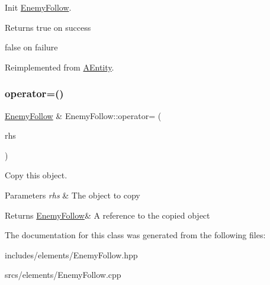 Init \hyperlink{class_enemy_follow}{Enemy\+Follow}. 

\begin{DoxyReturn}{Returns}
true on success 

false on failure 
\end{DoxyReturn}


Reimplemented from \hyperlink{class_a_entity_a450361b684fa02e4ffe0ba406b8e3b30}{A\+Entity}.

\mbox{\label{class_enemy_follow_a3cc6083a7064b33fabe7e0b7a4a69910}} 
\subsubsection{\texorpdfstring{operator=()}{operator=()}}
{\footnotesize\ttfamily \hyperlink{class_enemy_follow}{Enemy\+Follow} \& Enemy\+Follow\+::operator= (\begin{DoxyParamCaption}\item[{\hyperlink{class_enemy_follow}{Enemy\+Follow} const \&}]{rhs }\end{DoxyParamCaption})}



Copy this object. 


\begin{DoxyParams}{Parameters}
{\em rhs} & The object to copy \\
\hline
\end{DoxyParams}
\begin{DoxyReturn}{Returns}
\hyperlink{class_enemy_follow}{Enemy\+Follow}\& A reference to the copied object 
\end{DoxyReturn}


The documentation for this class was generated from the following files\+:\begin{DoxyCompactItemize}
\item 
includes/elements/Enemy\+Follow.\+hpp\item 
srcs/elements/Enemy\+Follow.\+cpp\end{DoxyCompactItemize}

